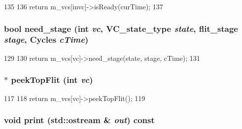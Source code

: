 \begin{DoxyCode}
135     {
136         return m_vcs[invc]->isReady(curTime);
137     }
\end{DoxyCode}
\hypertarget{classInputUnit__d_ad41c4d2863462e8f6435be6ae77accea}{
\subsubsection[{need\_\-stage}]{\setlength{\rightskip}{0pt plus 5cm}bool need\_\-stage (int {\em vc}, \/  {\bf VC\_\-state\_\-type} {\em state}, \/  {\bf flit\_\-stage} {\em stage}, \/  {\bf Cycles} {\em cTime})}}
\label{classInputUnit__d_ad41c4d2863462e8f6435be6ae77accea}



\begin{DoxyCode}
129     {
130         return m_vcs[vc]->need_stage(state, stage, cTime);
131     }
\end{DoxyCode}
\hypertarget{classInputUnit__d_a52ab0f3b8ab7d8161346a1ddfc53e09f}{
\subsubsection[{peekTopFlit}]{$\ast$ peekTopFlit (int {\em vc})}}
\label{classInputUnit__d_a52ab0f3b8ab7d8161346a1ddfc53e09f}



\begin{DoxyCode}
117     {
118         return m_vcs[vc]->peekTopFlit();
119     }
\end{DoxyCode}
\hypertarget{classInputUnit__d_ac55fe386a101fbae38c716067c9966a0}{
\subsubsection[{print}]{\setlength{\rightskip}{0pt plus 5cm}void print (std::ostream \& {\em out}) const}}
\label{classInputUnit__d_ac55fe386a101fbae38c716067c9966a0}


